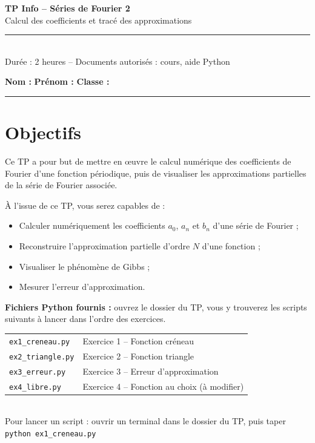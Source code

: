 \documentclass[12pt,a4paper]{article}
\begin{document}
\thispagestyle{fancy}

\begin{center}
    {\LARGE \textbf{TP Info -- Séries de Fourier 2}}\\[4pt]
    {\large Calcul des coefficients et tracé des approximations}\\[8pt]
    \rule{0.6\linewidth}{0.4pt}\\[6pt]
    {\small Durée : 2 heures \quad -- \quad Documents autorisés : cours, aide Python}
\end{center}

\medskip
\noindent\textbf{Nom :} \dotfill \quad \textbf{Prénom :} \dotfill \quad \textbf{Classe :} \makebox[3cm]{\dotfill}

\bigskip

\hrule

\section*{Objectifs}

Ce TP a pour but de mettre en œuvre le calcul numérique des coefficients de Fourier d'une fonction périodique, puis de visualiser les approximations partielles de la série de Fourier associée.

À l'issue de ce TP, vous serez capables de :
\begin{itemize}
    \item Calculer numériquement les coefficients $a_0$, $a_n$ et $b_n$ d'une série de Fourier ;
    \item Reconstruire l'approximation partielle d'ordre $N$ d'une fonction ;
    \item Visualiser le phénomène de Gibbs ;
    \item Mesurer l'erreur d'approximation.
\end{itemize}

\begin{fichierbox}
\textbf{Fichiers Python fournis :} ouvrez le dossier du TP, vous y trouverez les scripts suivants à lancer dans l'ordre des exercices.\\[4pt]
\begin{tabular}{ll}
    \texttt{ex1\_creneau.py}  & Exercice 1 -- Fonction créneau \\
    \texttt{ex2\_triangle.py} & Exercice 2 -- Fonction triangle \\
    \texttt{ex3\_erreur.py}   & Exercice 3 -- Erreur d'approximation \\
    \texttt{ex4\_libre.py}    & Exercice 4 -- Fonction au choix (à modifier) \\
\end{tabular}\\[4pt]
Pour lancer un script : ouvrir un terminal dans le dossier du TP, puis taper \texttt{python ex1\_creneau.py}
\end{fichierbox}
\end{document}
